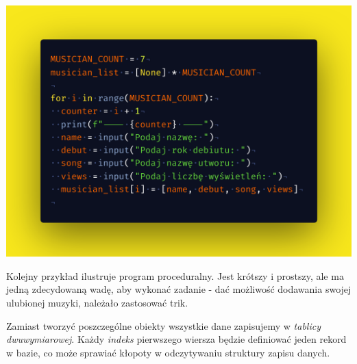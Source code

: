 \includegraphics[width=\textwidth]{images/procedural-python.png}

\begin{flushleft}
    Kolejny przykład ilustruje program proceduralny. Jest krótszy i prostszy, ale ma jedną zdecydowaną wadę, aby wykonać zadanie - dać możliwość dodawania swojej ulubionej muzyki, należało zastosować trik. 
\end{flushleft}

\begin{flushleft}
    Zamiast tworzyć poszczególne obiekty wszystkie dane zapisujemy w \emph{tablicy dwuwymiarowej}. Każdy \emph{indeks} pierwszego wiersza będzie definiować jeden rekord w bazie, co może sprawiać kłopoty w odczytywaniu struktury zapisu danych.
\end{flushleft}
